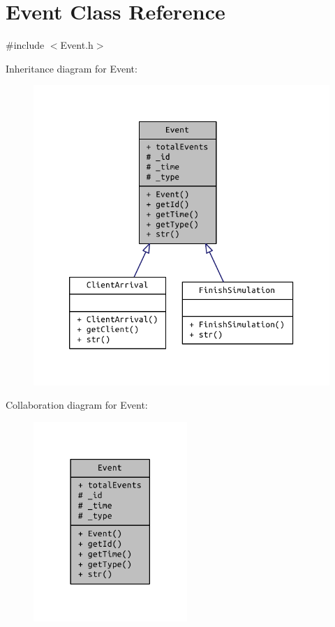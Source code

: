 \hypertarget{class_event}{}\section{Event Class Reference}
\label{class_event}


{\ttfamily \#include $<$Event.\+h$>$}



Inheritance diagram for Event\+:
\nopagebreak
\begin{figure}[H]
\begin{center}
\leavevmode
\includegraphics[width=326pt]{class_event__inherit__graph}
\end{center}
\end{figure}


Collaboration diagram for Event\+:
\nopagebreak
\begin{figure}[H]
\begin{center}
\leavevmode
\includegraphics[width=165pt]{class_event__coll__graph}
\end{center}
\end{figure}
